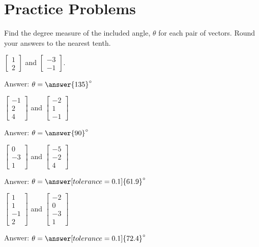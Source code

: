 \documentclass{ximera}
\begin{document}
\section*{Practice Problems}
\begin{problem}%
Find the degree measure of the included angle, $\theta$ for each pair of vectors.  Round your answers to the nearest tenth.
  \begin{problem}\label{prob:anglebetweenvectors1}
  $\begin{bmatrix}1\\2\end{bmatrix}$ and $\begin{bmatrix}-3\\-1\end{bmatrix}$.
  
  Answer: $\theta=\answer{135}^\circ$
  \end{problem}
  
  \begin{problem}\label{prob:anglebetweenvectors2}
  $\begin{bmatrix}-1\\2\\4\end{bmatrix}$ and $\begin{bmatrix}-2\\1\\-1\end{bmatrix}$
  
   Answer: $\theta=\answer{90}^\circ$
  \end{problem}

\begin{problem}\label{prob:anglebetweenvectors3}
  $\begin{bmatrix}0\\-3\\1\end{bmatrix}$ and $\begin{bmatrix}-5\\-2\\4\end{bmatrix}$
  
   Answer: $\theta=\answer[tolerance=0.1]{61.9}^\circ$
  \end{problem}

\begin{problem}\label{prob:anglebetweenvectors4}
  $\begin{bmatrix}1\\1\\-1\\2\end{bmatrix}$ and $\begin{bmatrix}-2\\0\\-3\\1\end{bmatrix}$
  
   Answer: $\theta=\answer[tolerance=0.1]{72.4}^\circ$
  \end{problem}
  
  \end{problem}
\end{document}
